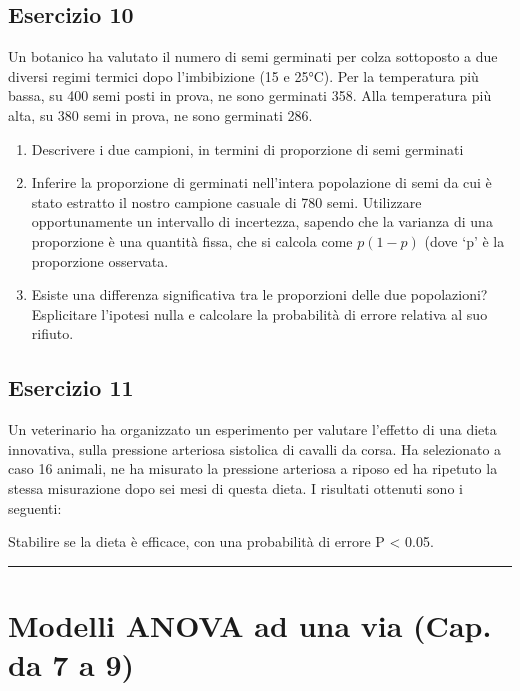 \documentclass[a4paper,12pt,oneside]{book}
\providecommand{\tightlist}{%
  \setlength{\itemsep}{0pt}\setlength{\parskip}{0pt}}
\begin{document}
\hypertarget{esercizio-10}{%
\subsection{Esercizio 10}\label{esercizio-10}}

Un botanico ha valutato il numero di semi germinati per colza sottoposto a due diversi regimi termici dopo l'imbibizione (15 e 25°C). Per la temperatura più bassa, su 400 semi posti in prova, ne sono germinati 358. Alla temperatura più alta, su 380 semi in prova, ne sono germinati 286.

\begin{enumerate}
\def\labelenumi{\arabic{enumi}.}
\tightlist
\item
  Descrivere i due campioni, in termini di proporzione di semi germinati
\item
  Inferire la proporzione di germinati nell'intera popolazione di semi da cui è stato estratto il nostro campione casuale di 780 semi. Utilizzare opportunamente un intervallo di incertezza, sapendo che la varianza di una proporzione è una quantità fissa, che si calcola come \(p ( 1- p)\) (dove `p' è la proporzione osservata.
\item
  Esiste una differenza significativa tra le proporzioni delle due popolazioni? Esplicitare l'ipotesi nulla e calcolare la probabilità di errore relativa al suo rifiuto.
\end{enumerate}

\hypertarget{esercizio-11}{%
\subsection{Esercizio 11}\label{esercizio-11}}

Un veterinario ha organizzato un esperimento per valutare l'effetto di una dieta innovativa, sulla pressione arteriosa sistolica di cavalli da corsa. Ha selezionato a caso 16 animali, ne ha misurato la pressione arteriosa a riposo ed ha ripetuto la stessa misurazione dopo sei mesi di questa dieta. I risultati ottenuti sono i seguenti:

Stabilire se la dieta è efficace, con una probabilità di errore P \textless{} 0.05.

\begin{center}\rule{0.5\linewidth}{0.5pt}\end{center}

\hypertarget{modelli-anova-ad-una-via-cap.-da-7-a-9}{%
\section{Modelli ANOVA ad una via (Cap. da 7 a 9)}\label{modelli-anova-ad-una-via-cap.-da-7-a-9}}
\end{document}
